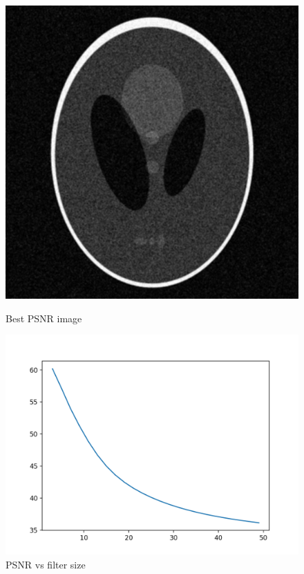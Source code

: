 \documentclass{article}
\begin{document}
    \begin{figure}[!htb]
      \includegraphics[scale=0.3]{./basic_denoising/shepplogan/average_best_gaussian.png}
      \caption{Best PSNR image}
    \endminipage \hfill
      \includegraphics[scale=.45]{./basic_denoising/shepplogan/average_psnr_gaussian.png}
      \caption{PSNR vs filter size}
    \endminipage
    \end{figure}
    
\end{document}
